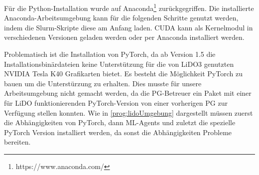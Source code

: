 Für die Python-Installation wurde auf Anaconda\footnote{https://www.anaconda.com/} zurückgegriffen. Die installierte Anaconda-Arbeitsumgebung kann für die folgenden Schritte genutzt werden, indem die Slurm-Skripte diese am Anfang laden. CUDA kann als Kernelmodul in verschiedenen Versionen geladen werden oder per Anaconda installiert werden.

Problematisch ist die Installation von PyTorch, da ab Version 1.5 die Installationsbinärdateien keine Unterstützung für die von LiDO3 genutzten NVIDIA Tesla K40 Grafikarten bietet. Es besteht die Möglichkeit PyTorch zu bauen um die Unterstürzung zu erhalten. Dies musste für unsere Arbeitsumgebung nicht gemacht werden, da die PG-Betreuer ein Paket mit einer für LiDO funktionierenden PyTorch-Version von einer vorherigen PG zur Verfügung stellen konnten. Wie in \ref{prog:lidoUmgebung} dargestellt müssen zuerst die Abhängigkeiten von PyTorch, dann ML-Agents und zuletzt die spezielle PyTorch Version installiert werden, da sonst die Abhängigkeiten Probleme bereiten.

